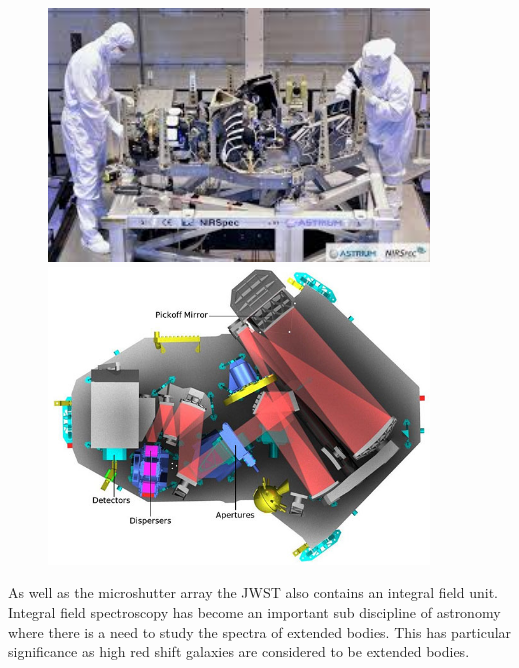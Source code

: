 			\begin{figure}[htbp]
				\begin{minipage}[c]{0.5\linewidth}
					\centering
					\includegraphics[width=0.9\textwidth]{../Images/nirspec_construction.jpeg}
					\caption{\label{fig:nirspec_construction}}
				\end{minipage}
				\begin{minipage}[c]{0.5\linewidth}
					\centering
					\includegraphics[width=0.9\textwidth]{../Images/nirspec_mirrors.jpeg}
					\caption{\label{fig:nirspec_mirrors}}
				\end{minipage}
			\end{figure}

			As well as the microshutter array the JWST also contains an integral field unit. Integral field spectroscopy has become an important sub discipline of astronomy where there is a need to study the spectra of extended bodies. This has particular significance as high red shift galaxies are considered to be extended bodies.

